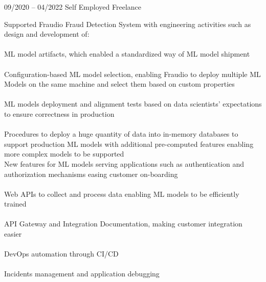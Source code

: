 \documentclass[9pt, green]{template/developercv} %
\begin{document}
{\begin{entrylist}
	\entry
	{09/2020 -- 04/2022 }
	{}
	{Self Employed \space\cpipe\space Freelance}
	{
		\vspace{0.3mm}
		\begin{minipage}[t]{0.75\textwidth}
			\vspace{-\baselineskip}
            Supported Fraudio Fraud Detection System with engineering activities such as design and development of:\\
            \vspace{-3mm}\\
            \itemmarker ML model artifacts, which enabled a standardized way of ML model shipment\\
            \vspace{-3mm}\\
            \itemmarker Configuration-based ML model selection, enabling Fraudio to deploy multiple ML Models on the same machine and select them based on custom properties\\
            \vspace{-3mm}\\
            \itemmarker ML models deployment and alignment tests based on data scientists' expectations to ensure correctness in production\\
            \vspace{-3mm}\\
            \itemmarker Procedures to deploy a huge quantity of data into in-memory databases to support production ML models with additional pre-computed features enabling more complex models to be supported\\
            \itemmarker New features for ML models serving applications such as authentication and authorization mechanisms easing customer on-boarding\\
            \vspace{-3mm}\\
            \itemmarker Web APIs to collect and process data enabling ML models to be efficiently trained\\
            \vspace{-3mm}\\
            \itemmarker API Gateway and Integration Documentation, making customer integration easier\\
            \vspace{-3mm}\\
            \itemmarker DevOps automation through CI/CD\\
            \vspace{-3mm}\\
            \itemmarker Incidents management and application debugging\\
            \vspace{-3mm}\\
		\end{minipage}

}
\end{entrylist}}
\end{document}
